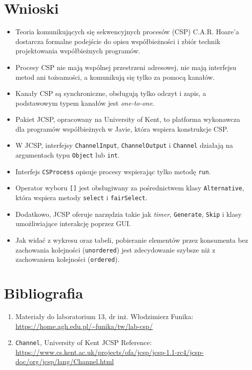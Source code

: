 \documentclass[11pt]{article}
\begin{document}
    \hypertarget{wnioski}{%
\section{Wnioski}\label{wnioski}}

\begin{itemize}
\item
  Teoria komunikujących się sekwencyjnych procesów (CSP) C.A.R. Hoare'a
  dostarcza formalne podejście do opisu współbieżności i zbiór technik
  projektowania współbieżnych programów.
\item
  Procesy CSP nie mają wspólnej przestrzeni adresowej, nie mają
  interfejsu metod ani tożsamości, a komunikują się tylko za pomocą
  kanałów.
\item
  Kanały CSP są synchroniczne, obsługują tylko odczyt i zapis, a
  podstawowym typem kanałów jest \emph{one-to-one}.
\item
  Pakiet JCSP, opracowany na University of Kent, to platforma wykonawcza
  dla programów współbieżnych w Javie, która wspiera konstrukcje CSP.
\item
  W JCSP, interfejsy \texttt{ChannelInput}, \texttt{ChannelOutput} i
  \texttt{Channel} działają na argumentach typu \texttt{Object} lub
  \texttt{int}.
\item
  Interfejs \texttt{CSProcess} opisuje procesy wspierając tylko metodę
  \texttt{run}.
\item
  Operator wyboru \texttt{{[}{]}} jest obsługiwany za pośrednictwem
  klasy \texttt{Alternative}, która wspiera metody \texttt{select} i
  \texttt{fairSelect}.
\item
  Dodatkowo, JCSP oferuje narzędzia takie jak \emph{timer},
  \texttt{Generate}, \texttt{Skip} i klasy umożliwiające interakcję
  poprzez GUI.
\item
  Jak widać z wykresu oraz tabeli, pobieranie elementów przez konsumenta
  bez zachowania kolejności (\texttt{unordered}) jest zdecydowanie
  szybsze niż z zachowaniem kolejności (\texttt{ordered}).
\end{itemize}

    \hypertarget{bibliografia}{%
\section{Bibliografia}\label{bibliografia}}

\begin{enumerate}
\def\labelenumi{\arabic{enumi}.}
\item
  Materiały do laboratorium 13, dr inż. Włodzimierz Funika:\\
  \url{https://home.agh.edu.pl/~funika/tw/lab-csp/}
\item
  \texttt{Channel}, University of Kent JCSP Reference:\\
  \url{https://www.cs.kent.ac.uk/projects/ofa/jcsp/jcsp-1.1-rc4/jcsp-doc/org/jcsp/lang/Channel.html}
\end{enumerate}


    
    
    
\end{document}
